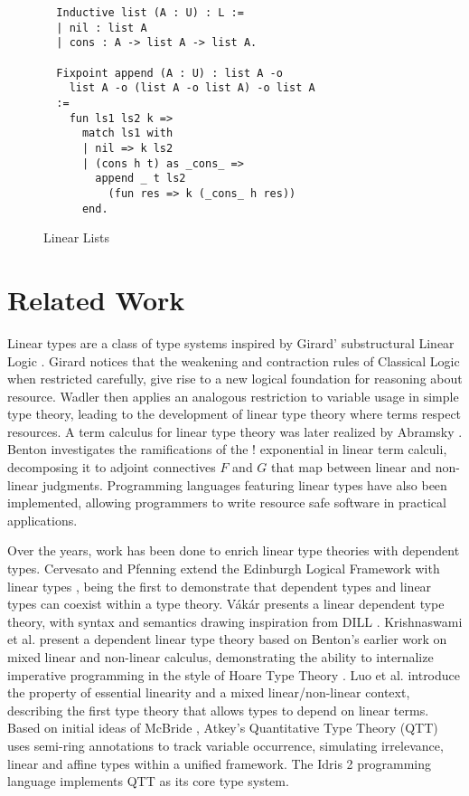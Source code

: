 \documentclass[sigplan,screen,review,authordraft]{acmart}
\begin{document}
\begin{figure}[h]
  \caption{Linear Lists}
  \begin{verbatim}
  Inductive list (A : U) : L :=
  | nil : list A
  | cons : A -> list A -> list A.
  
  Fixpoint append (A : U) : list A -o 
    list A -o (list A -o list A) -o list A 
  :=
    fun ls1 ls2 k =>
      match ls1 with
      | nil => k ls2
      | (cons h t) as _cons_ =>
        append _ t ls2 
          (fun res => k (_cons_ h res))
      end.
  \end{verbatim}
  \label{list}
  \Description{}
\end{figure}

\section{Related Work}
Linear types are a class of type systems inspired by Girard' substructural Linear Logic \cite{girard}. Girard notices that the weakening and contraction rules of Classical Logic when restricted carefully, give rise to a new logical foundation for reasoning about resource. Wadler \cite{wadler1990,wadler1991} then applies an analogous restriction to variable usage in simple type theory, leading to the development of linear type theory where terms respect resources. A term calculus for linear type theory was later realized by Abramsky \cite{abramsky1993}. Benton \cite{benton1994} investigates the ramifications of the ! exponential in linear term calculi, decomposing it to adjoint connectives $F$ and $G$ that map between linear and non-linear judgments. Programming languages \cite{l3,ats,linear-haskell} featuring linear types have also been implemented, allowing programmers to write resource safe software in practical applications.

Over the years, work has been done to enrich linear type theories with dependent types. Cervesato and Pfenning extend the Edinburgh Logical Framework with linear types \cite{lf,llf}, being the first to demonstrate that dependent types and linear types can coexist within a type theory. V\'{a}k\'{a}r \cite{vakar14} presents a linear dependent type theory, with syntax and semantics drawing inspiration from DILL \cite{dill}.  Krishnaswami et al. present a dependent linear type theory \cite{neel15} based on Benton's earlier work on mixed linear and non-linear calculus, demonstrating the ability to internalize imperative programming in the style of Hoare Type Theory \cite{htt}. Luo et al. \cite{luo} introduce the property of essential linearity and a mixed linear/non-linear context, describing the first type theory that allows types to depend on linear terms. Based on initial ideas of McBride \cite{nothing}, Atkey's Quantitative Type Theory (QTT) \cite{qtt} uses semi-ring annotations to track variable occurrence, simulating irrelevance, linear and affine types within a unified framework. The Idris 2 programming language \cite{idris2} implements QTT as its core type system.
\end{document}
